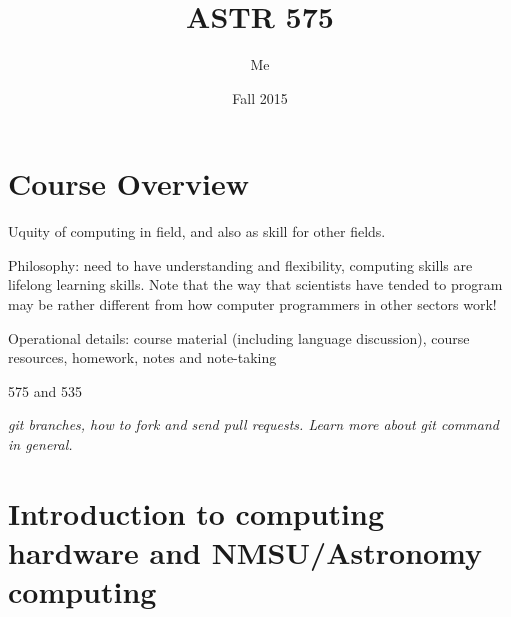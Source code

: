 \documentclass{article}
\title{ASTR 575}
\author{Me}
\date{Fall 2015}
\renewcommand{\descriptionlabel}[1]{%
    \bfseries\textcolor{myGreen}{#1}}
\newcommand{\test}[1]{%
    \begin{center}
        \colorbox{hl}{\parbox{0.9\textwidth}{\emph{\centering #1}}}
    \end{center}}
\begin{document}
\maketitle
{}
\tableofcontents



\section{Course Overview}
Uquity of computing in field, and also as skill for other fields.

Philosophy: need to have understanding and flexibility, computing
skills are lifelong learning skills. Note that the way that scientists
have tended to program may be rather different from how computer
programmers in other sectors work!

Operational details: course material (including language discussion),
course resources, homework, notes and note-taking

575 and 535

\test{git branches, how to fork and send pull requests. Learn more
about git command in general.}


\section{Introduction to computing hardware and NMSU/Astronomy computing}
\end{document}
